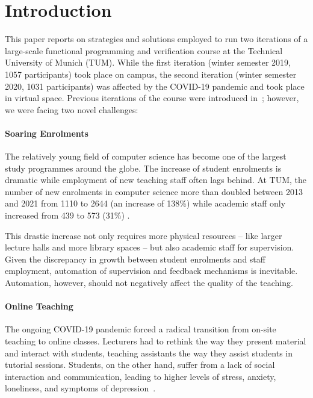 \section{Introduction}

This paper reports on strategies and solutions employed to
run two iterations of a large-scale functional programming and verification course at the Technical University of Munich (TUM).
While the first iteration (winter semester 2019, 1057 participants)
took place on campus,
the second iteration (winter semester 2020, 1031 participants) was affected by the COVID-19 pandemic and took place in virtual space.
Previous iterations of the course were introduced in~\cite{next_1100};
however, we were facing two novel challenges:

\paragraph{Soaring Enrolments}
The relatively young field of computer science has
become one of the largest study programmes around the globe.
The increase of student enrolments is dramatic
\cite{comp_sci_growth1,comp_sci_growth2}
while employment of new teaching staff often lags behind.
At TUM, the number of new enrolments in computer science more than doubled between 2013 and 2021 from 1110 to 2644 (an increase of 138\%)
while academic staff only increased from 439 to 573 (31\%) \cite{tum_numbers}.

This drastic increase not only requires more physical resources -- like larger lecture halls and more library spaces --
but also academic staff for supervision.
Given the discrepancy in growth between student enrolments and staff employment,
automation of supervision and feedback mechanisms is inevitable.
Automation, however, should not
negatively affect the quality of the teaching.

\paragraph{Online Teaching}
The ongoing COVID-19 pandemic forced a radical
transition from on-site teaching to online classes.
Lecturers had to rethink the way they present material and interact with students,
teaching assistants the way they assist students in tutorial sessions.
Students, on the other hand, suffer from a lack of social interaction and communication, leading to higher
levels of stress, anxiety, loneliness, and symptoms of depression~\cite{students_lockdown1}.

